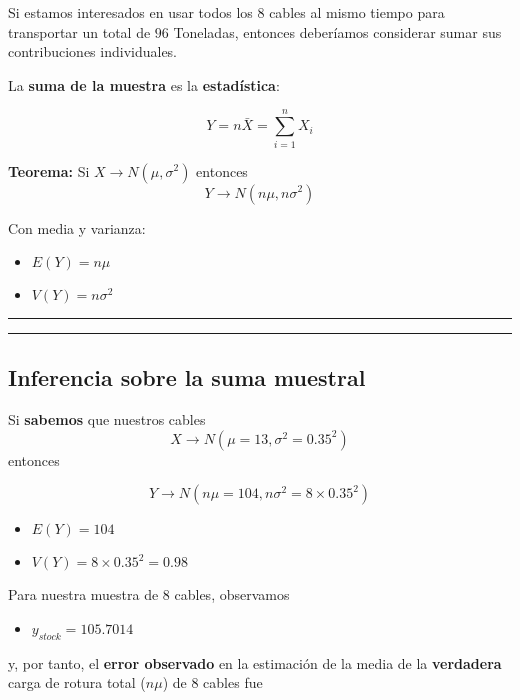 \documentclass[
]{book}
\providecommand{\tightlist}{%
  \setlength{\itemsep}{0pt}\setlength{\parskip}{0pt}}
\begin{document}
Si estamos interesados en usar todos los \(8\) cables al mismo tiempo para transportar un total de \(96\) Toneladas, entonces deberíamos considerar sumar sus contribuciones individuales.

La \textbf{suma de la muestra} es la \textbf{estadística}:

\[Y=n \bar{X}=\sum_{i=1}^n X_i\]

\textbf{Teorema:} Si \(X \rightarrow N(\mu, \sigma^2)\) entonces \[Y \rightarrow N(n\mu, n\sigma^2)\]

Con media y varianza:

\begin{itemize}
\tightlist
\item
  \(E(Y)=n\mu\)
\item
  \(V(Y)=n\sigma^2\)
\end{itemize}

\begin{center}\rule{0.5\linewidth}{0.5pt}\end{center}

\begin{center}\rule{0.5\linewidth}{0.5pt}\end{center}

\hypertarget{inferencia-sobre-la-suma-muestral}{%
\subsection{Inferencia sobre la suma muestral}\label{inferencia-sobre-la-suma-muestral}}

Si \textbf{sabemos} que nuestros cables \[X \rightarrow N(\mu=13, \sigma^2=0.35^2)\] entonces

\[Y \rightarrow N(n\mu=104, n\sigma^2=8\times 0.35^2)\]

\begin{itemize}
\tightlist
\item
  \(E(Y)=104\)
\item
  \(V(Y)=8\times 0.35^2=0.98\)
\end{itemize}

Para nuestra muestra de \(8\) cables, observamos

\begin{itemize}
\tightlist
\item
  \(y_{stock}=105.7014\)
\end{itemize}

y, por tanto, el \textbf{error observado} en la estimación de la media de la \textbf{verdadera} carga de rotura total (\(n\mu\)) de \(8\) cables fue
\end{document}
